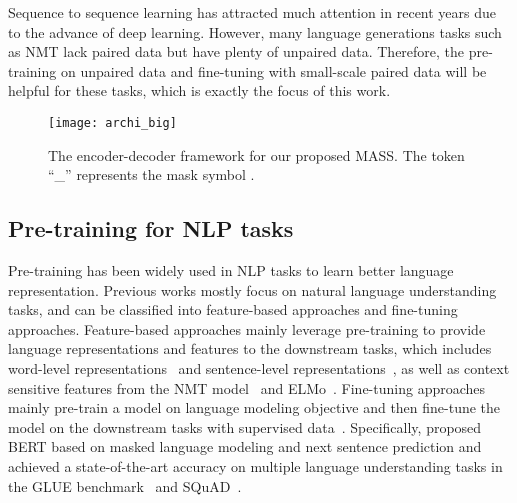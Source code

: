 \documentclass{article}
\begin{document}
	Sequence to sequence learning has attracted much attention in recent years due to the advance of deep learning. However, many language generations tasks such as NMT lack paired data but have plenty of unpaired data. Therefore, the pre-training on unpaired data and fine-tuning with small-scale paired data will be helpful for these tasks, which is exactly the focus of this work.
	


	\begin{figure*}[h]
		\small
		\centering
		\texttt{[image: archi\_big]}
		\vspace{-0.2cm}
		\caption{The encoder-decoder framework for our proposed MASS. The token ``\_'' represents the mask symbol .} 
		\label{pretrain_archi}
	\end{figure*}
	
	\subsection{Pre-training for NLP tasks}
	Pre-training has been widely used in NLP tasks to learn better language representation. Previous works mostly focus on natural language understanding tasks, and can be classified into feature-based approaches and fine-tuning approaches. Feature-based approaches mainly leverage pre-training to provide language representations and features to the downstream tasks, which includes word-level representations~\citep{brown1992class,ando2005framework,blitzer2006domain,collobert2008unified,mikolov2013distributed,pennington2014glove} and sentence-level representations~\citep{kiros2015skip,logeswaran2018efficient,le2014distributed}, as well as context sensitive features from the NMT model~\citep{mccann2017learned} and ELMo~\citep{peters2018deep}. Fine-tuning approaches mainly pre-train a model on language modeling objective and then fine-tune the model on the downstream tasks with supervised data~\citep{dai2015semi,howard2018universal,radford2018improving,devlin2018bert}. Specifically, \citet{devlin2018bert} proposed BERT based on masked language modeling and next sentence prediction and achieved a state-of-the-art accuracy on multiple language understanding tasks in the GLUE benchmark~\citep{wang2018glue} and SQuAD~\citep{rajpurkar2016squad}.
	
\end{document}
